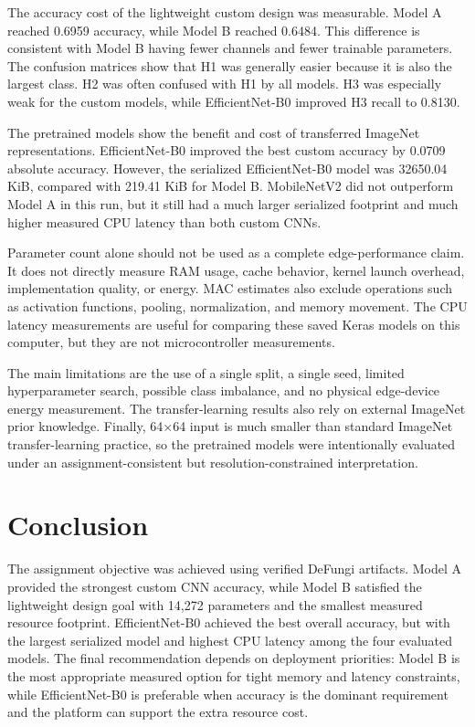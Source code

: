 \documentclass[11pt,a4paper]{article}
\begin{document}
The accuracy cost of the lightweight custom design was measurable. Model A reached 0.6959 accuracy, while Model B reached 0.6484. This difference is consistent with Model B having fewer channels and fewer trainable parameters. The confusion matrices show that H1 was generally easier because it is also the largest class. H2 was often confused with H1 by all models. H3 was especially weak for the custom models, while EfficientNet-B0 improved H3 recall to 0.8130.

The pretrained models show the benefit and cost of transferred ImageNet representations. EfficientNet-B0 improved the best custom accuracy by 0.0709 absolute accuracy. However, the serialized EfficientNet-B0 model was 32650.04 KiB, compared with 219.41 KiB for Model B. MobileNetV2 did not outperform Model A in this run, but it still had a much larger serialized footprint and much higher measured CPU latency than both custom CNNs.

Parameter count alone should not be used as a complete edge-performance claim. It does not directly measure RAM usage, cache behavior, kernel launch overhead, implementation quality, or energy. MAC estimates also exclude operations such as activation functions, pooling, normalization, and memory movement. The CPU latency measurements are useful for comparing these saved Keras models on this computer, but they are not microcontroller measurements.

The main limitations are the use of a single split, a single seed, limited hyperparameter search, possible class imbalance, and no physical edge-device energy measurement. The transfer-learning results also rely on external ImageNet prior knowledge. Finally, 64$\times$64 input is much smaller than standard ImageNet transfer-learning practice, so the pretrained models were intentionally evaluated under an assignment-consistent but resolution-constrained interpretation.

\section{Conclusion}
The assignment objective was achieved using verified DeFungi artifacts. Model A provided the strongest custom CNN accuracy, while Model B satisfied the lightweight design goal with 14,272 parameters and the smallest measured resource footprint. EfficientNet-B0 achieved the best overall accuracy, but with the largest serialized model and highest CPU latency among the four evaluated models. The final recommendation depends on deployment priorities: Model B is the most appropriate measured option for tight memory and latency constraints, while EfficientNet-B0 is preferable when accuracy is the dominant requirement and the platform can support the extra resource cost.
\end{document}
